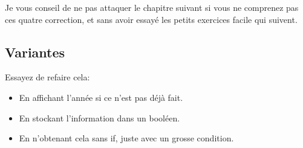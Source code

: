 Je vous conseil de ne pas attaquer le chapitre suivant
si vous ne comprenez pas ces quatre correction,
et sans avoir essayé les petits exercices facile qui suivent.
\subsection{Variantes}
Essayez de refaire cela:
\begin{itemize}

\item En affichant l'année si ce n'est pas déjà fait.
\item En stockant l'information dans un booléen.
\item En n'obtenant cela sans if, juste avec un grosse condition.

\end{itemize}